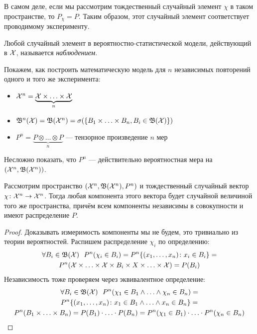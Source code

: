 \begin{note}
	В самом деле, если мы рассмотрим тождественный случайный элемент $\chi$ в таком пространстве, то $P_\chi = P$. Таким образом, этот случайный элемент соответствует проводимому эксперименту.
\end{note}

\begin{definition}
	Любой случайный элемент в вероятностно-статистической модели, действующий в $\mathcal{X}$, называется \textit{наблюдением}.
\end{definition}

\begin{note}
	Покажем, как построить математическую модель для $n$ независимых повторений одного и того же эксперимента:
	\begin{itemize}
		\item $\mathcal{X}^n = \underbrace{\mathcal{X} \times \ldots \times \mathcal{X}}_n$
		
		\item $\mathfrak{B}^n(\mathcal{X}) = \mathfrak{B}(\mathcal{X}^n) = \sigma(\{B_1 \times \ldots \times B_n, B_i \in \mathfrak{B}(\mathcal{X})\})$
		
		\item $P^n = \underbrace{P \otimes \ldots \otimes P}_n$ --- тензорное произведение $n$ мер
	\end{itemize}
	Несложно показать, что $P^n$ --- действительно вероятностная мера на $(\mathcal{X}^n, \mathfrak{B}(\mathcal{X}^n))$.
\end{note}

\begin{proposition}
	Рассмотрим пространство $(\mathcal{X}^n, \mathfrak{B}(\mathcal{X}^n), P^n)$ и тождественный случайный вектор $\chi \colon \mathcal{X}^n \to \mathcal{X}^n$. Тогда любая компонента этого вектора будет случайной величиной того же пространства, причём всем компоненты независимы в совокупности и имеют распределение $P$.
\end{proposition}

\begin{proof}
	Доказывать измеримость компоненты мы не будем, это тривиально из теории вероятностей. Распишем распределение $\chi_i$ по определению:
	\begin{multline*}
		\forall B_i \in \mathfrak{B}(\mathcal{X})\ \ P^n(\chi_i \in B_i) = P^n\{(x_1, \ldots, x_n) \colon x_i \in B_i\} =
		\\
		P^n(\mathcal{X} \times \ldots \times \mathcal{X} \times B_i \times X \times \ldots \times \mathcal{X}) = P(B_i)
	\end{multline*}
	Независимость тоже проверяем через эквивалентное определение:
	\begin{multline*}
		\forall B_i \in \mathfrak{B}(\mathcal{X})\ \ P^n(\chi_1 \in B_1 \wedge \ldots \wedge \chi_n \in B_n) =
		\\
		P^n\{(x_1, \ldots, x_n) \colon x_1 \in B_1 \wedge \ldots \wedge x_n \in B_n\} =
		\\
		P^n(B_1 \times \ldots \times B_n) = P(B_1) \cdot \ldots \cdot P(B_n) = P^n(\chi_1 \in B_1) \cdot \ldots \cdot P^n(\chi_n \in B_n)
	\end{multline*}
\end{proof}

